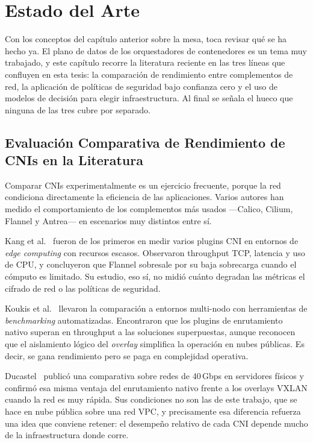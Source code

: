 \chapter{Estado del Arte} \label{sec:EstadoArte}

Con los conceptos del capítulo anterior sobre la mesa, toca revisar qué se ha hecho ya. El plano de datos de los orquestadores de contenedores es un tema muy trabajado, y este capítulo recorre la literatura reciente en las tres líneas que confluyen en esta tesis: la comparación de rendimiento entre complementos de red, la aplicación de políticas de seguridad bajo confianza cero y el uso de modelos de decisión para elegir infraestructura. Al final se señala el hueco que ninguna de las tres cubre por separado.

\section{Evaluación Comparativa de Rendimiento de CNIs en la Literatura}

Comparar CNIs experimentalmente es un ejercicio frecuente, porque la red condiciona directamente la eficiencia de las aplicaciones. Varios autores han medido el comportamiento de los complementos más usados ---Calico, Cilium, Flannel y Antrea--- en escenarios muy distintos entre sí.

Kang et al.~\cite{ref7} fueron de los primeros en medir varios plugins CNI en entornos de \emph{edge computing} con recursos escasos. Observaron throughput TCP, latencia y uso de CPU, y concluyeron que Flannel sobresale por su baja sobrecarga cuando el cómputo es limitado. Su estudio, eso sí, no midió cuánto degradan las métricas el cifrado de red o las políticas de seguridad.

Koukis et al.~\cite{ref8} llevaron la comparación a entornos multi-nodo con herramientas de \emph{benchmarking} automatizadas. Encontraron que los plugins de enrutamiento nativo superan en throughput a las soluciones superpuestas, aunque reconocen que el aislamiento lógico del \emph{overlay} simplifica la operación en nubes públicas. Es decir, se gana rendimiento pero se paga en complejidad operativa.

Ducastel~\cite{ref33} publicó una comparativa sobre redes de 40\,Gbps en servidores físicos y confirmó esa misma ventaja del enrutamiento nativo frente a los overlays VXLAN cuando la red es muy rápida. Sus condiciones no son las de este trabajo, que se hace en nube pública sobre una red VPC, y precisamente esa diferencia refuerza una idea que conviene retener: el desempeño relativo de cada CNI depende mucho de la infraestructura donde corre.

